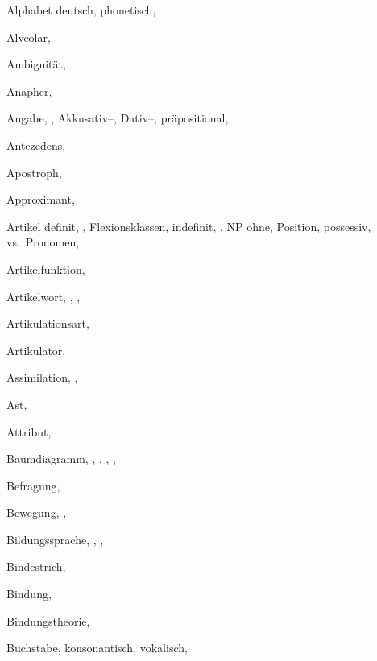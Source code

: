 \begin{theindex}
  \item Alphabet
    \subitem deutsch, 
    \subitem phonetisch, 
  \item Alveolar, 
  \item Ambiguität, 
  \item Anapher, 
  \item Angabe, , 
    \subitem Akkusativ--, 
    \subitem Dativ--, 
    \subitem präpositional, 
  \item Antezedens, 
  \item Apostroph, 
  \item Approximant, 
  \item Artikel
    \subitem definit, , 
    \subitem Flexionsklassen, 
    \subitem indefinit, , 
    \subitem NP ohne, 
    \subitem Position, 
    \subitem possessiv, 
    \subitem vs.\ Pronomen, 
  \item Artikelfunktion, 
  \item Artikelwort, , , 
  \item Artikulationsart, 
  \item Artikulator, 
  \item Assimilation, , 
  \item Ast, 
  \item Attribut, 

  \indexspace

  \item Baumdiagramm, , , , 
		, 
  \item Befragung, 
  \item Bewegung, , 
  \item Bildungssprache, , , 
  \item Bindestrich, 
  \item Bindung, 
  \item Bindungstheorie, 
  \item Buchstabe, 
    \subitem konsonantisch, 
    \subitem vokalisch, 


\end{theindex}
